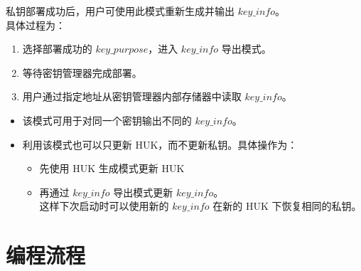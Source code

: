 \documentclass[main\_\_CN.tex]{subfiles}
\begin{document}
私钥部署成功后，用户可使用此模式重新生成并输出 \hyperref[para:keyinfo]{\begin{math}key\_info\end{math}}。\\
具体过程为：
\begin{enumerate}
    \item 选择部署成功的 \begin{math}key\_purpose\end{math}，进入 \hyperref[para:keyinfo]{\begin{math}key\_info\end{math}} 导出模式。
    \item 等待密钥管理器完成部署。
    \item 用户通过指定地址从密钥管理器内部存储器中读取 \hyperref[para:keyinfo]{\begin{math}key\_info\end{math}}。
\end{enumerate}

\vspace{-0.5em}
\begin{tiplisting}
\vspace{-2em}
\begin{itemize}
    \item 该模式可用于对同一个密钥输出不同的 \hyperref[para:keyinfo]{\begin{math}key\_info\end{math}}。
    \item 利用该模式也可以只更新 HUK，而不更新私钥。具体操作为：
    \begin{itemize}
        \item 先使用 HUK 生成模式更新 HUK
        \item 再通过 \hyperref[para:keyinfo]{\begin{math}key\_info\end{math}} 导出模式更新 \hyperref[para:keyinfo]{\begin{math}key\_info\end{math}}。\\
        这样下次启动时可以使用新的 \hyperref[para:keyinfo]{\begin{math}key\_info\end{math}} 在新的 HUK 下恢复相同的私钥。
    \end{itemize}
\end{itemize}
\end{tiplisting}




\section{编程流程}
\label{sec:keymng-prog-procedures}
\end{document}
